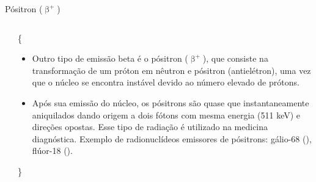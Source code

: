\documentclass[presentation,professionalfonts,aspectratio=169]{beamer}
\begin{document}
\begin{frame}[label={sec:orge739c11}]{Pósitron (\(\upbeta^+\))}
\begin{columns}
\begin{column}{0.45\columnwidth}

\end{column}


\begin{column}{0.45\columnwidth}
\small\{
\begin{itemize}
\item Outro tipo de emissão beta é o pósitron (\(\upbeta ^+\)), que consiste na transformação de  um  próton  em  nêutron  e  pósitron  (antielétron),  uma  vez  que  o  núcleo  se  encontra  instável  devido  ao  número  elevado  de  prótons.
\item Após  sua  emissão  do  núcleo, os pósitrons são quase que instantaneamente aniquilados dando origem a dois fótons com mesma energia (511 keV) e direções opostas. Esse tipo de radiação é utilizado na medicina diagnóstica. Exemplo de radionuclídeos emissores de pósitrons: gálio-68  (), flúor-18 ().
\end{itemize}
\}
\end{column}
\end{columns}
\end{frame}
\end{document}
